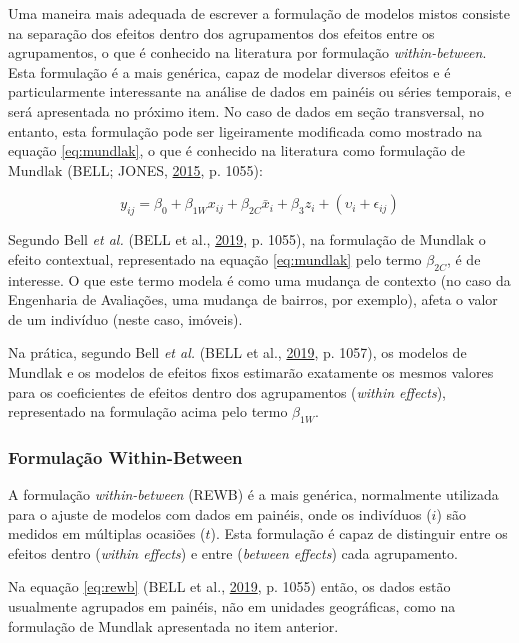 \documentclass[
  a4paper, 11pt]{article}
\begin{document}
Uma maneira mais adequada de escrever a formulação de modelos mistos
consiste na separação dos efeitos dentro dos agrupamentos dos efeitos
entre os agrupamentos, o que é conhecido na literatura por formulação
\emph{within-between}. Esta formulação é a mais genérica, capaz de
modelar diversos efeitos e é particularmente interessante na análise de
dados em painéis ou séries temporais, e será apresentada no próximo
item. No caso de dados em seção transversal, no entanto, esta formulação
pode ser ligeiramente modificada como mostrado na equação
\ref{eq:mundlak}, o que é conhecido na literatura como formulação de
Mundlak (BELL; JONES, \protect\hyperlink{ref-bell2015}{2015}, p. 1055):

\begin{equation} \label{eq:mundlak}
y_{ij} = \beta_0 + \beta_{1W} x_{ij} + \beta_{2C}\bar{x}_i+ \beta_3 z_i + (\upsilon_i + \epsilon_{ij}) 
\end{equation}

Segundo Bell \emph{et al.} (BELL et al.,
\protect\hyperlink{ref-bell2019}{2019}, p. 1055), na formulação de
Mundlak o efeito contextual, representado na equação \ref{eq:mundlak}
pelo termo \(\beta_{2C}\), é de interesse. O que este termo modela é
como uma mudança de contexto (no caso da Engenharia de Avaliações, uma
mudança de bairros, por exemplo), afeta o valor de um indivíduo (neste
caso, imóveis).

Na prática, segundo Bell \emph{et al.} (BELL et al.,
\protect\hyperlink{ref-bell2019}{2019}, p. 1057), os modelos de Mundlak
e os modelos de efeitos fixos estimarão exatamente os mesmos valores
para os coeficientes de efeitos dentro dos agrupamentos
(\emph{within effects}), representado na formulação acima pelo termo
\(\beta_{1W}\).

\hypertarget{formulauxe7uxe3o-within-between}{%
\subsubsection{Formulação
Within-Between}\label{formulauxe7uxe3o-within-between}}

A formulação \emph{within-between} (REWB) é a mais genérica, normalmente
utilizada para o ajuste de modelos com dados em painéis, onde os
indivíduos (\(i\)) são medidos em múltiplas ocasiões (\(t\)). Esta
formulação é capaz de distinguir entre os efeitos dentro (\emph{within
effects}) e entre (\emph{between effects}) cada agrupamento.

Na equação \ref{eq:rewb} (BELL et al.,
\protect\hyperlink{ref-bell2019}{2019}, p. 1055) então, os dados estão
usualmente agrupados em painéis, não em unidades geográficas, como na
formulação de Mundlak apresentada no item anterior.
\end{document}
